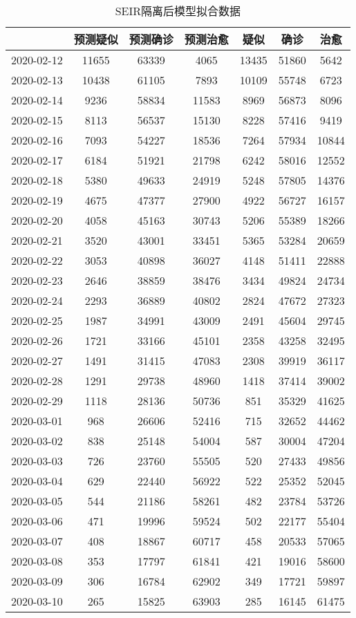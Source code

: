 \begin{longtable}{ccccccc}
\caption{SEIR隔离后模型拟合数据}\\
\hline
&预测疑似&预测确诊&预测治愈&疑似&确诊&治愈\\
\hline
2020-02-12&11655&63339&4065&13435&51860&5642\\
2020-02-13&10438&61105&7893&10109&55748&6723\\
2020-02-14&9236&58834&11583&8969&56873&8096\\
2020-02-15&8113&56537&15130&8228&57416&9419\\
2020-02-16&7093&54227&18536&7264&57934&10844\\
2020-02-17&6184&51921&21798&6242&58016&12552\\
2020-02-18&5380&49633&24919&5248&57805&14376\\
2020-02-19&4675&47377&27900&4922&56727&16157\\
2020-02-20&4058&45163&30743&5206&55389&18266\\
2020-02-21&3520&43001&33451&5365&53284&20659\\
2020-02-22&3053&40898&36027&4148&51411&22888\\
2020-02-23&2646&38859&38476&3434&49824&24734\\
2020-02-24&2293&36889&40802&2824&47672&27323\\
2020-02-25&1987&34991&43009&2491&45604&29745\\
2020-02-26&1721&33166&45101&2358&43258&32495\\
2020-02-27&1491&31415&47083&2308&39919&36117\\
2020-02-28&1291&29738&48960&1418&37414&39002\\
2020-02-29&1118&28136&50736&851&35329&41625\\
2020-03-01&968&26606&52416&715&32652&44462\\
2020-03-02&838&25148&54004&587&30004&47204\\
2020-03-03&726&23760&55505&520&27433&49856\\
2020-03-04&629&22440&56922&522&25352&52045\\
2020-03-05&544&21186&58261&482&23784&53726\\
2020-03-06&471&19996&59524&502&22177&55404\\
2020-03-07&408&18867&60717&458&20533&57065\\
2020-03-08&353&17797&61841&421&19016&58600\\
2020-03-09&306&16784&62902&349&17721&59897\\
2020-03-10&265&15825&63903&285&16145&61475\\

\end{longtable}

